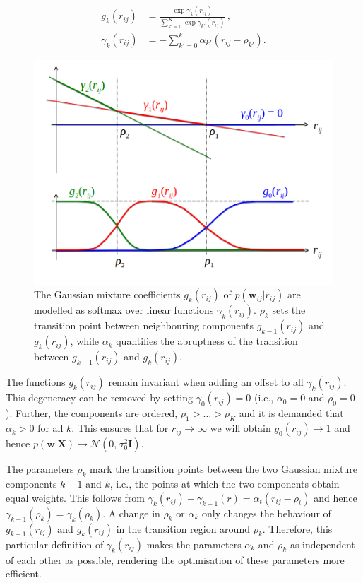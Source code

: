 \documentclass[12pt,a4paper,twoside]{book}
\newcommand{\Gauss}{\mathcal{N}}
\newcommand{\I}{\mathbf{I}}
\newcommand{\rij}{r_{ij}}
\newcommand{\w}{\mathbf{w}}
\newcommand{\wij}{\mathbf{w}_{ij}}
\newcommand{\X}{\mathbf{X}}
\theoremstyle{definition}
\theoremstyle{definition}
\theoremstyle{remark}
\begin{document}
\begin{align}
      g_k(\rij)        &= \frac{\exp \gamma_k(\rij)}{\sum_{k'=0}^K \exp \gamma_{k'}(\rij)} \, , \\
      \gamma_k(\rij)   &= - \sum_{k'=0}^{k} \alpha_{k'} ( \rij - \rho_{k'}) .
\label{eq:definition-mixture-weights}
\end{align}








\begin{figure}
\includegraphics[width=0.5\linewidth]{img/theory/softmax_linear_fct} \caption{The Gaussian mixture coefficients
\(g_k(\rij)\) of \(p(\wij|\rij)\) are modelled as softmax over linear
functions \(\gamma_k(\rij)\). \(\rho_k\) sets the transition point
between neighbouring components \(g_{k-1}(\rij)\) and \(g_k(\rij)\),
while \(\alpha_k\) quantifies the abruptness of the transition between
\(g_{k-1}(\rij)\) and \(g_k(\rij)\).}\label{fig:softmax-linear-fct}
\end{figure}

The functions \(g_k(\rij)\) remain invariant when adding an offset to
all \(\gamma_k(\rij)\). This degeneracy can be removed by setting
\(\gamma_0(\rij) = 0\) (i.e., \(\alpha_0 = 0\) and \(\rho_0=0\)).
Further, the components are ordered, \(\rho_1> \ldots > \rho_K\) and it
is demanded that \(\alpha_k > 0\) for all \(k\). This ensures that for
\(\rij \rightarrow \infty\) we will obtain \(g_0(\rij) \rightarrow 1\)
and hence \(p(\w | \X) \rightarrow \Gauss(0, \sigma_0^2 \I )\).

The parameters \(\rho_k\) mark the transition points between the two
Gaussian mixture components \(k-1\) and \(k\), i.e., the points at which
the two components obtain equal weights. This follows from
\(\gamma_k(\rij) - \gamma_{k-1}(r) = \alpha_{t} ( \rij - \rho_{t})\) and
hence \(\gamma_{k-1}(\rho_k) = \gamma_k(\rho_k)\). A change in
\(\rho_k\) or \(\alpha_k\) only changes the behaviour of
\(g_{k-1}(\rij)\) and \(g_k(\rij)\) in the transition region around
\(\rho_k\). Therefore, this particular definition of \(\gamma_k(\rij)\)
makes the parameters \(\alpha_k\) and \(\rho_k\) as independent of each
other as possible, rendering the optimisation of these parameters more
efficient.
\end{document}
